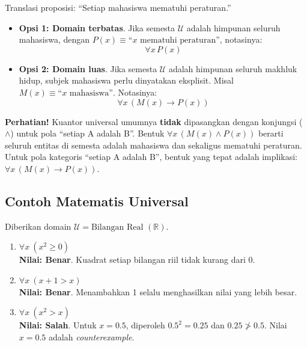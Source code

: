 \begin{contoh}
Translasi proposisi: ``Setiap mahasiswa mematuhi peraturan.''
\begin{itemize}
    \item \textbf{Opsi 1: Domain terbatas}. Jika semesta $\mathcal{U}$ adalah himpunan seluruh mahasiswa, dengan $P(x) \equiv \text{``}x \text{ mematuhi peraturan''}$, notasinya:
    \[ \forall x \, P(x) \]
    
    \item \textbf{Opsi 2: Domain luas}. Jika semesta $\mathcal{U}$ adalah himpunan seluruh makhluk hidup, subjek mahasiswa perlu dinyatakan eksplisit. Misal $M(x) \equiv \text{``}x \text{ mahasiswa''}$. Notasinya:
    \[ \forall x \, (M(x) \rightarrow P(x)) \]
\end{itemize}
\end{contoh}

\begin{catatan}
\textbf{Perhatian!} Kuantor universal umumnya \textbf{tidak} dipasangkan dengan konjungsi ($\land$) untuk pola ``setiap A adalah B''. Bentuk $\forall x \, (M(x) \land P(x))$ berarti seluruh entitas di semesta adalah mahasiswa dan sekaligus mematuhi peraturan. Untuk pola kategoris ``setiap A adalah B'', bentuk yang tepat adalah implikasi: $\forall x \, (M(x) \rightarrow P(x))$.
\end{catatan}

\subsection{Contoh Matematis Universal}

\begin{contoh}
Diberikan domain $\mathcal{U} = \text{Bilangan Real } (\mathbb{R})$.
\begin{enumerate}
    \item $\forall x \ (x^2 \geq 0)$ \\ \textbf{Nilai: Benar}. Kuadrat setiap bilangan riil tidak kurang dari 0.
    \item $\forall x \ (x + 1 > x)$ \\ \textbf{Nilai: Benar}. Menambahkan 1 selalu menghasilkan nilai yang lebih besar.
    \item $\forall x \ (x^2 > x)$ \\ \textbf{Nilai: Salah}. Untuk $x = 0.5$, diperoleh $0.5^2 = 0.25$ dan $0.25 \not> 0.5$. Nilai $x=0.5$ adalah \textit{counterexample}.
\end{enumerate}
\end{contoh}

